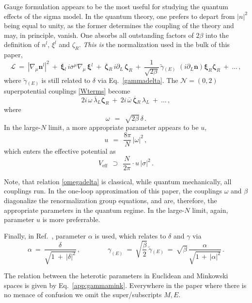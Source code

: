 \documentclass[epsfig,12pt]{article}
\def\beq{\begin{equation}}
\def\eeq{\end{equation}}
\def\beq{\begin{equation}}
\def\eeq{\end{equation}}
\newcommand{\ntwoo}{${\mathcal N}= \left(0,2\right) $ }
\newcommand{\p}{\partial}
\newcommand{\wt}{\widetilde}
\newcommand{\ov}{\overline}
\newcommand{\mc}[1]{\mathcal{#1}}
\newcommand{\xir}{\xi_R}
\newcommand{\bzr}{\ov{\zeta}{}_R}
\newcommand{\zr}{\zeta_R}
\newcommand{\nbar}{\ov{n}}
\newcommand{\lal}{\lambda_L}
\newcommand{\blal}{\ov{\lambda}{}_L}
\newcommand{\bxi}{\ov{\xi}{}}
\newcommand{\sse}{{\scriptscriptstyle(E)}}
\begin{document}
{Gauge formulation appears to be the most useful for studying the quantum effects of the sigma
model.
In the quantum theory, one prefers to depart from $ |n|^2 $ being equal to unity, as the former determines the coupling
of the theory and may, in principle, vanish. 
One absorbs all outstanding factors of $ 2\beta $ into the definition of $ n^l $, $ \xi^l $
and $ \zr $.
{\it This is} the normalization used in the bulk of this paper,
\beq
	\mc{L} ~=~ | \nabla_\mu \bm {n}{}^l |^2   ~+~ \bm{\bxi}{}_l\, i\ov{\sigma}{}^\mu\nabla_\mu\, \bm{\xi}{}^l ~+~ 
		   \bm\bzr\, i\p_L\, \bm\zr ~+~ 
		   \frac{1}{\sqrt{2\beta}}\, \wt{\gamma}{}_\sse\, \, (i\p_L \bm \nbar) \bm\xir \bm\zr 
		   ~+~ \dots\,,
\eeq
where $ \wt{\gamma}{}_\sse $ is still related to $ \delta $ via Eq.~\eqref{gammadelta}.
The \ntwoo superpotential couplings \eqref{Wterms} become
\beq
		 2i\, \omega\, \blal \bm\zr ~+~ 2i\, \ov{\omega}\, \bm\bzr\, \lal ~+~ \dots \,,
\eeq
where
\beq
\label{omegadelta}
		\omega ~~=~~ \sqrt{2\beta}\, \delta\,.
\eeq
In the large-$N$ limit, a more appropriate parameter appears to be $ u $,
\beq
		u ~~=~~ \frac{8\pi}{N}\, |\omega|^2\,,
\eeq
which enters the effective potential as
\beq
		V_\text{eff}  ~~\supset~~  \frac{N}{2\pi} \cdot u\, |\sigma|^2\,.
\eeq

Note, that relation \eqref{omegadelta} is classical, while quantum mechanically, all couplings run.
In the one-loop approximation of this paper, the couplings $ \omega $ and $ \beta $ diagonalize the
renormalization group equations, and are, therefore, the appropriate parameters in the
quantum regime. 
In the large-$N$ limit, again, parameter $ u $ is more preferrable. 

Finally, in Ref.~\cite{SY1}, parameter $ \alpha $ is used, which relates to $ \delta $ and $ \gamma $ via
\beq
	\alpha   ~=~ \frac{\delta}{\sqrt{1 ~+~ |\delta|^2} }\,,
	\qquad\qquad
	\gamma_\sse ~=~ \sqrt{\frac{\beta}{2}}\, \wt{\gamma}{}_\sse  
                    ~=~ \sqrt{\beta}\,\frac{\alpha}{\sqrt{1 \,+\, |\alpha|^2}}\,.
\eeq

The relation between the heterotic parameters in Euclidean and Minkowski spaces 
is given by Eq.~\eqref{app:gammamink}.
Everywhere in the paper where there is no menace of confusion we omit the super/sub\-scripts $M,E$.


}
\end{document}
